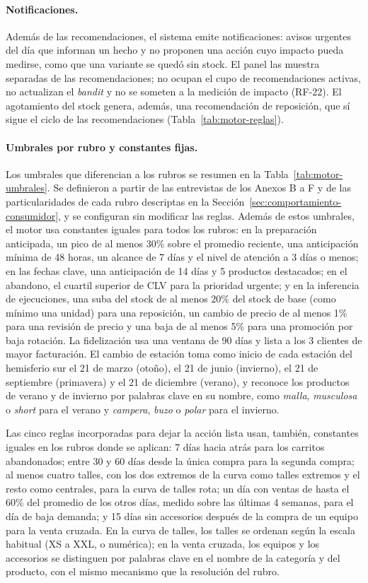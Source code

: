 \paragraph{Notificaciones.} Además de las recomendaciones, el sistema emite notificaciones: avisos urgentes del día que informan un hecho y no proponen una acción cuyo impacto pueda medirse, como que una variante se quedó sin stock. El panel las muestra separadas de las recomendaciones; no ocupan el cupo de recomendaciones activas, no actualizan el \emph{bandit} y no se someten a la medición de impacto (RF-22). El agotamiento del stock genera, además, una recomendación de reposición, que sí sigue el ciclo de las recomendaciones (Tabla~\ref{tab:motor-reglas}).

\paragraph{Umbrales por rubro y constantes fijas.} Los umbrales que diferencian a los rubros se resumen en la Tabla~\ref{tab:motor-umbrales}. Se definieron a partir de las entrevistas de los Anexos B a F y de las particularidades de cada rubro descriptas en la Sección~\ref{sec:comportamiento-consumidor}, y se configuran sin modificar las reglas. Además de estos umbrales, el motor usa constantes iguales para todos los rubros: en la preparación anticipada, un pico de al menos 30\% sobre el promedio reciente, una anticipación mínima de 48 horas, un alcance de 7 días y el nivel de atención a 3 días o menos; en las fechas clave, una anticipación de 14 días y 5 productos destacados; en el abandono, el cuartil superior de CLV para la prioridad urgente; y en la inferencia de ejecuciones, una suba del stock de al menos 20\% del stock de base (como mínimo una unidad) para una reposición, un cambio de precio de al menos 1\% para una revisión de precio y una baja de al menos 5\% para una promoción por baja rotación. La fidelización usa una ventana de 90 días y lista a los 3 clientes de mayor facturación. El cambio de estación toma como inicio de cada estación del hemisferio sur el 21 de marzo (otoño), el 21 de junio (invierno), el 21 de septiembre (primavera) y el 21 de diciembre (verano), y reconoce los productos de verano y de invierno por palabras clave en su nombre, como \emph{malla}, \emph{musculosa} o \emph{short} para el verano y \emph{campera}, \emph{buzo} o \emph{polar} para el invierno.

Las cinco reglas incorporadas para dejar la acción lista usan, también, constantes iguales en los rubros donde se aplican: 7 días hacia atrás para los carritos abandonados; entre 30 y 60 días desde la única compra para la segunda compra; al menos cuatro talles, con los dos extremos de la curva como talles extremos y el resto como centrales, para la curva de talles rota; un día con ventas de hasta el 60\% del promedio de los otros días, medido sobre las últimas 4 semanas, para el día de baja demanda; y 15 días sin accesorios después de la compra de un equipo para la venta cruzada. En la curva de talles, los talles se ordenan según la escala habitual (XS a XXL, o numérica); en la venta cruzada, los equipos y los accesorios se distinguen por palabras clave en el nombre de la categoría y del producto, con el mismo mecanismo que la resolución del rubro.

